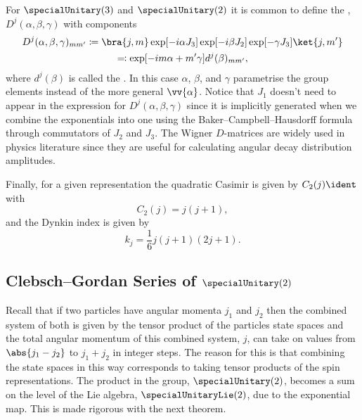For \(\specialUnitary(3)\) and \(\specialUnitary(2)\) it is common to define the , \(D^j(\alpha, \beta, \gamma)\) with components
\begin{multline}
    D^j(\alpha, \beta, \gamma)_{mm'} \coloneqq \bra{j, m} \exp[-i\alpha J_3] \exp[-i\beta J_2]\exp[-\gamma J_3]\ket{j, m'}\\
    \eqqcolon \exp[-im\alpha + m'\gamma] d^j(\beta)_{mm'},
\end{multline}
where \(d^j(\beta)\) is called the .
In this case \(\alpha\), \(\beta\), and \(\gamma\) parametrise the group elements instead of the more general \(\vv{\alpha}\).
Notice that \(J_1\) doesn't need to appear in the expression for \(D^j(\alpha, \beta, \gamma)\) since it is implicitly generated when we combine the exponentials into one using the Baker--Campbell--Hausdorff formula through commutators of \(J_2\) and \(J_3\).
The Wigner \(D\)-matrices are widely used in physics literature since they are useful for calculating angular decay distribution amplitudes.

Finally, for a given representation the quadratic Casimir is given by \(C_2(j)\ident\) with
\begin{equation}
    C_2(j) = j (j + 1),
\end{equation}
and the Dynkin index is given by
\begin{equation}
    k_j = \frac{1}{6}j(j + 1)(2j + 1).
\end{equation}

\subsection{Clebsch--Gordan Series of \texorpdfstring{\(\specialUnitary(2)\)}{SU(2)}}
Recall that if two particles have angular momenta \(j_1\) and \(j_2\) then the combined system of both is given by the tensor product of the particles state spaces and the total angular momentum of this combined system, \(j\), can take on values from \(\abs{j_1 - j_2}\) to \(j_1 + j_2\) in integer steps.
The reason for this is that combining the state spaces in this way corresponds to taking tensor products of the spin representations.
The product in the group, \(\specialUnitary(2)\), becomes a sum on the level of the Lie algebra, \(\specialUnitaryLie(2)\), due to the exponential map.
This is made rigorous with the next theorem.


